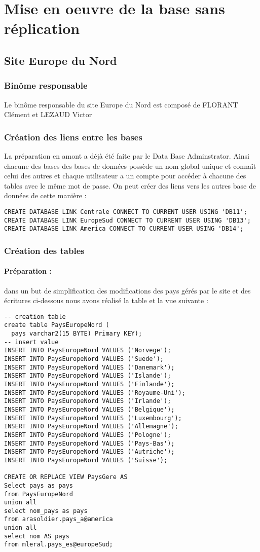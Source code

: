 \documentclass[10pt,a4paper,twoside]{article}
\begin{document}
\section{Mise en oeuvre de la base sans réplication}
\subsection{Site Europe du Nord}
\subsubsection{Binôme responsable}
Le binôme responsable du site Europe du Nord est composé de FLORANT Clément et LEZAUD Victor
\subsubsection{Création des liens entre les bases}
La préparation en amont a déjà été faite par le Data Base Adminstrator. Ainsi chacune des bases des bases de données possède un nom global unique et connaît celui des autres et chaque utilisateur a un compte pour accéder à chacune des tables avec le même mot de passe. On peut créer des liens vers les autres base de données de cette manière :
\begin{verbatim}
CREATE DATABASE LINK Centrale CONNECT TO CURRENT USER USING 'DB11';
CREATE DATABASE LINK EuropeSud CONNECT TO CURRENT USER USING 'DB13';
CREATE DATABASE LINK America CONNECT TO CURRENT USER USING 'DB14';
\end{verbatim}

\subsubsection{Création des tables}
\paragraph{Préparation :} dans un but de simplification des modifications des pays gérés par le site et des écritures ci-dessous nous avons réalisé la table et la vue suivante :
\begin{verbatim}
-- creation table
create table PaysEuropeNord (
  pays varchar2(15 BYTE) Primary KEY);
-- insert value
INSERT INTO PaysEuropeNord VALUES ('Norvege');
INSERT INTO PaysEuropeNord VALUES ('Suede');
INSERT INTO PaysEuropeNord VALUES ('Danemark');
INSERT INTO PaysEuropeNord VALUES ('Islande');
INSERT INTO PaysEuropeNord VALUES ('Finlande');
INSERT INTO PaysEuropeNord VALUES ('Royaume-Uni');
INSERT INTO PaysEuropeNord VALUES ('Irlande');
INSERT INTO PaysEuropeNord VALUES ('Belgique');
INSERT INTO PaysEuropeNord VALUES ('Luxembourg');
INSERT INTO PaysEuropeNord VALUES ('Allemagne');
INSERT INTO PaysEuropeNord VALUES ('Pologne');
INSERT INTO PaysEuropeNord VALUES ('Pays-Bas');
INSERT INTO PaysEuropeNord VALUES ('Autriche');
INSERT INTO PaysEuropeNord VALUES ('Suisse');

CREATE OR REPLACE VIEW PaysGere AS 
Select pays as pays
from PaysEuropeNord
union all
select nom_pays as pays
from arasoldier.pays_a@america
union all
select nom AS pays
from mleral.pays_es@europeSud;
\end{verbatim} 
\end{document}
